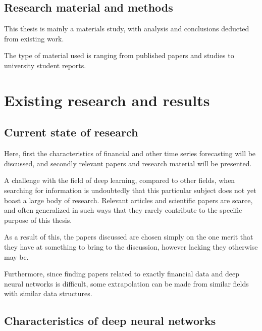 \subsection{Research material and methods}


This thesis is mainly a materials study, with analysis and conclusions deducted from existing work.

The type of material used is ranging from published papers and studies to university student reports.



\newpage

\section{Existing research and results}


\subsection{Current state of research}

Here, first the characteristics of financial and other time series forecasting will be discussed, and secondly relevant papers and research material will be presented.

A challenge with the field of deep learning, compared to other fields, when searching for information is undoubtedly that this particular subject does not yet boast a large body of research. Relevant articles and scientific papers are scarce, and often generalized in such ways that they rarely contribute to the specific purpose of this thesis. 

As a result of this, the papers discussed are chosen simply on the one merit that they have at something to bring to the discussion, however lacking they otherwise may be.

Furthermore, since finding papers related to exactly financial data and deep neural networks is difficult, some extrapolation can be made from similar fields with similar data structures.


\subsection{Characteristics of deep neural networks}

